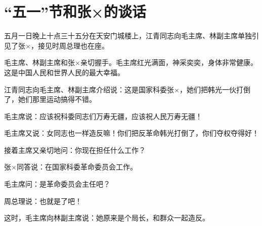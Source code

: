 \section[ “五一”节和张×的谈话（一九六七年五月一日）]{ “五一”节和张×的谈话}


五月一日晚上十点三十五分在天安门城楼上，江青同志向毛主席、林副主席单独引见了张×，接见时周总理也在座。

毛主席、林副主席和张×亲切握手。毛主席红光满面，神采奕奕，身体非常健康。这是中国人民和世界人民的最大幸福。

江青同志向毛主席、林副主席介绍说：这是国家科委张×，她们把韩光一伙打倒了，她们那里运动搞得不错。

毛主席说：应该祝科委同志们万寿无疆，应该祝人民万寿无疆！

毛主席又说：女同志也一样造反嘛！你们把反革命韩光打倒了，你们夺权夺得好！

接着主席又亲切地问：你现在担任什么工作？

张×同答说：在国家科委革命委员会工作。

毛主席问：是革命委员会主任吧？

周总理说：也就是了吧！

这时，毛主席向林副主席说：她原来是个局长，和群众一起造反。

